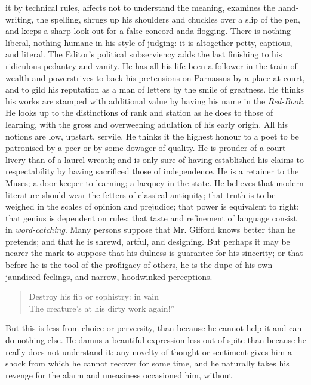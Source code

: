 it by technical rules, affects not to understand the meaning,
examines the hand-writing, the spelling, shrugs up his shoulders
and chuckles over a slip of the pen, and keeps a sharp look-out
for a false concord and\textemdash a flogging. There is nothing
liberal, nothing humane in his style of judging: it is altogether
petty, captious, and literal. The Editor's political subserviency
adds the last finishing to his ridiculous pedantry and vanity. He
has all his life been a follower in the train of wealth and
power\textemdash strives to back his pretensions on Parnassus by a
place at court, and to gild his reputation as a man of letters by
the smile of greatness. He thinks his works are stamped with
additional value by having his name in the \emph{Red-Book}. He
looks up to the distinctions of rank and station as he does to
those of learning, with the gross and overweening adulation of his
early origin. All his notions are low, upstart, servile. He thinks
it the highest honour to a poet to be patronised by a peer or by
some dowager of quality. He is prouder of a court-livery than of a
laurel-wreath; and is only sure of having established his claims
to respectability by having sacrificed those of independence. He
is a retainer to the Muses; a door-keeper to learning; a lacquey
in the state. He believes that modern literature should wear the
fetters of classical antiquity; that truth is to be weighed in the
scales of opinion and prejudice; that power is equivalent to
right; that genius is dependent on rules; that taste and
refinement of language consist in \emph{word-catching}. Many
persons suppose that Mr. Gifford knows better than he pretends;
and that he is shrewd, artful, and designing.  But perhaps it may
be nearer the mark to suppose that his dulness is guarantee for
his sincerity; or that before he is the tool of the profligacy of
others, he is the dupe of his own jaundiced feelings, and narrow,
hoodwinked perceptions.
\begin{verse}
  Destroy his fib or sophistry: in vain\textemdash
\\
The creature's at his dirty work again!''

\end{verse}
But this is less from choice or perversity, than because he cannot
help it and can do nothing else. He damns a beautiful expression
less out of spite than because he really does not understand it:
any novelty of thought or sentiment gives him a shock from which
he cannot recover for some time, and he naturally takes his
revenge for the alarm and uneasiness occasioned him, without
